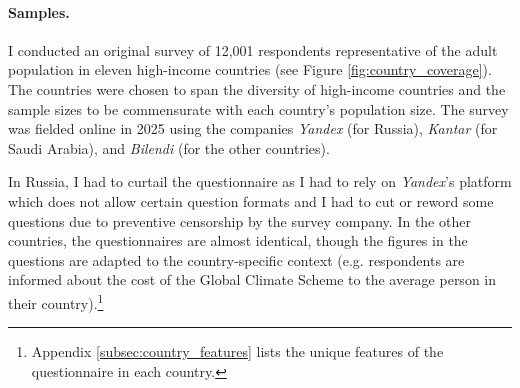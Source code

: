 \documentclass[12pt,english]{article}
\begin{document}
\begin{bibunit}
\paragraph{Samples.}
I conducted an original survey of 12,001 respondents representative of the adult population in eleven high-income countries (see Figure \ref{fig:country_coverage}). The countries were chosen to span the diversity of high-income countries and the sample sizes to be commensurate with each country's population size. %
The survey was fielded online in 2025 using the companies \textit{Yandex} (for Russia), \textit{Kantar} (for Saudi Arabia), and \textit{Bilendi} (for the other countries).%

In Russia, I had to curtail the questionnaire as I had to rely on \textit{Yandex}'s platform which does not allow certain question formats and I had to cut or reword some questions due to preventive censorship by the survey company.%
In the other countries, the questionnaires are almost identical, though the figures in the questions are adapted to the country-specific context (e.g. respondents are informed about the cost of the Global Climate Scheme to the average person in their country).\footnote{Appendix \ref{subsec:country_features} lists the unique features of the questionnaire in each country.}


\end{bibunit}
\end{document}
